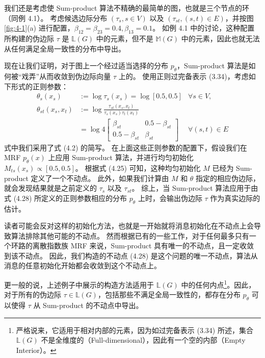 \begin{tcolorbox}
\begin{exam}

我们还是考虑使 Sum-product 算法不精确的最简单的图，也就是三个节点的环（同例 4.1）。
考虑候选边际分布 $(\tau_s, s \in V)$ 以及 $(\tau_{st}, (s, t) \in E)$，并按图 \ref{fig:4-1}(a) 进行配置，$\beta_{12} = \beta_{23} = 0.4, \beta_{13} = 0.1$。
如例 4.1 中的讨论，这种配置所构建的伪边际 $\tau$ 是 $\mathbb{L}(G)$ 中的元素，但不是 $\mathbb{M}(G)$ 中的元素，因此也就无法从任何满足全局一致性的分布中导出。

现在让我们证明，对于图上一个经过适当选择的分布 $p_{\theta}$，Sum-product 算法是如何被“戏弄”从而收敛到伪边际向量 $\tau$ 上的。
使用正则过完备表示 (3.34)，考虑如下形式的正则参数：
\begin{subequations}
\begin{align}
    \theta_s(x_s) &:= \log\tau_s(x_s) = \log [0.5, 0.5] &\forall s \in V, \\
    \theta_{st}(x_s, x_t) &:= \log\frac{\tau_{st}(x_s, x_t)}{\tau_s(x_s)\tau_t(x_t)} & \nonumber \\
    &= \log 4\begin{bmatrix}
        \beta_{st} & 0.5-\beta_{st} \\
        0.5-\beta_{st} & \beta_{st}
    \end{bmatrix} &\forall (s, t) \in E
\end{align}
\end{subequations}
式中我们采用了式 (4.2) 的简写。
在上面这些正则参数的配置下，假设我们在 MRF $p_{\theta}(x)$ 上应用 Sum-product 算法，并进行均匀初始化 $M_{ts}(x_s) \propto [0.5, 0.5]$。
根据式 (4.25) 可知，这种均匀初始化 $M$ 已经为 Sum-product 定义了一个不动点。
此外，如果我们计算由 $M$ 和 $\theta$ 指定的相应伪边际，就会发现结果就是之前定义的 $\tau_s$ 以及 $\tau_{st}$。
综上，当 Sum-product 算法应用于由式 (4.28) 所定义的正则参数相应的分布 $p_{\theta}$ 上时，会输出伪边际 $\tau$ 作为真实边际的估计。

读者可能会反对这样的初始化方法，也就是一开始就将消息初始化在不动点上会导致算法排除其他可能的不动点。
然而根据已有的一些工作，对于任何最多只有一个环路的离散指数族 MRF 来说，Sum-product 具有唯一的不动点，且一定收敛到该不动点。
因此，我们构造的不动点 (4.28) 是这个问题的唯一不动点，算法从消息的任意初始化开始都会收敛到这个不动点上。

\end{exam}
\end{tcolorbox}

更一般的说，上述例子中展示的构造方法适用于 $\mathbb{L}(G)$ 中的任何内点\footnote{
    严格说来，它适用于相对内部的元素，因为如过完备表示 (3.34) 所述，集合 $\mathbb{L}(G)$ 不是全维度的（Full-dimensional），因此有一个空的内部（Empty Interior）。
}。因此，对于所有的伪边际 $\tau \in \mathbb{L}(G)$，包括那些不满足全局一致性的，都存在分布 $p_{\theta}$ 可以使得 $\tau$ 从 Sum-product 的不动点中导出。

